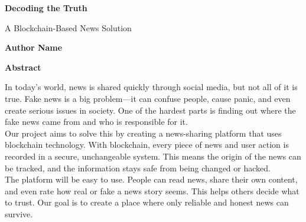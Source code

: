 \documentclass[10pt,a4paper]{article}
\begin{document}
	\thispagestyle{plain}
    \begin{center}
		\Large
		\textbf{Decoding the Truth}
		
		\vspace{0.4cm}
		\large
		 A Blockchain-Based News Solution
		
		\vspace{0.4cm}
		\textbf{Author Name}
		
		\vspace{0.9cm}
		\textbf{Abstract}
	\end{center}
In today’s world, news is shared quickly through social media, but not all of it is true. Fake news is a big problem—it can confuse people, cause panic, and even create serious issues in society. One of the hardest parts is finding out where the fake news came from and who is responsible for it.\\

Our project aims to solve this by creating a news-sharing platform that uses blockchain technology. With blockchain, every piece of news and user action is recorded in a secure, unchangeable system. This means the origin of the news can be tracked, and the information stays safe from being changed or hacked.\\

The platform will be easy to use. People can read news, share their own content, and even rate how real or fake a news story seems. This helps others decide what to trust. Our goal is to create a place where only reliable and honest news can survive.\\
\end{document}
